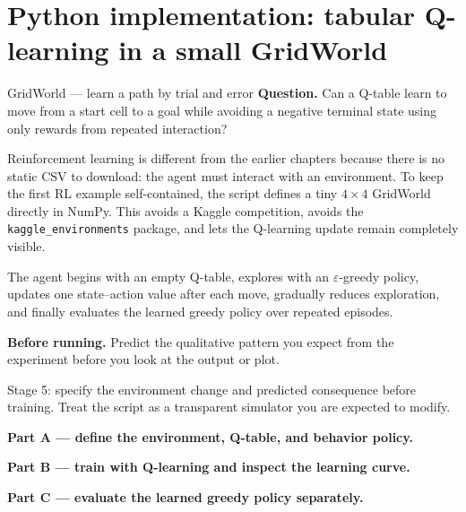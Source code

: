 \section{Python implementation: tabular Q-learning in a small GridWorld}
\label{sec:gridworld-q}

\begin{kaggleproject}{GridWorld --- learn a path by trial and error}
\textbf{Question.} Can a Q-table learn to move from a start cell to a goal while avoiding a negative terminal state using only rewards from repeated interaction?
\end{kaggleproject}

Reinforcement learning is different from the earlier chapters because there is no static CSV to download: the agent must interact with an environment. To keep the first RL example self-contained, the script defines a tiny $4\times4$ GridWorld directly in NumPy. This avoids a Kaggle competition, avoids the \texttt{kaggle\_environments} package, and lets the Q-learning update remain completely visible.

The agent begins with an empty Q-table, explores with an $\varepsilon$-greedy policy, updates one state--action value after each move, gradually reduces exploration, and finally evaluates the learned greedy policy over repeated episodes.

\textbf{Before running.} Predict the qualitative pattern you expect from the experiment before you look at the output or plot.

\begin{labmode}
Stage 5: specify the environment change and predicted consequence before training. Treat the script as a transparent simulator you are expected to modify.
\end{labmode}

\textbf{Part A --- define the environment, Q-table, and behavior policy.}



\textbf{Part B --- train with Q-learning and inspect the learning curve.}



\textbf{Part C --- evaluate the learned greedy policy separately.}




